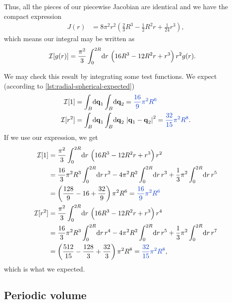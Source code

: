 Thus, all the pieces of our piecewise Jacobian are identical and we have the compact expression
\begin{align}
	J(r)
	&= 8 \pi^2 r^2 \left( \frac{2}{3} R^3 - \frac{1}{2} R^2 r + \frac{1}{24} r^3 \right),
			\label{eq:radial-spherical-jacobian}
\end{align}
which means our integral may be written as
\begin{align}
	\mathcal{I}[g(r)]
	&= \frac{\pi^2}{3} \int_0^{2 R}\! \dif r \, \left( 16 R^3 - 12 R^2 r + r^3 \right) r^2 g(r).
\end{align}

We may check this result by integrating some test functions.
We expect (according to \vref{lst:radial-spherical-expected})
\begin{subequations} \label{eq:radial-spherical-expected}
\begin{align}
	\mathcal{I}[1]
	&= \int_\ball\! \dif \vec{q}_1 \int_\ball\! \dif \vec{q}_2
	= \blue{\frac{16}{9} \pi^2 R^6} \\
	\mathcal{I}[r^2]
	&= \int_\ball\! \dif \vec{q}_1 \int_\ball\! \dif \vec{q}_2 \, \abs[0]{\vec{q}_1 - \vec{q}_2}^2
	= \blue{\frac{32}{15} \pi^2 R^8}.
\end{align}
\end{subequations}
If we use our expression, we get
\begin{subequations}
\begin{align}
	\mathcal{I}[1]
	&= \frac{\pi^2}{3} \int_0^{2 R}\! \dif r \, \left( 16 R^3 - 12 R^2 r + r^3 \right) r^2 \\
	&= \frac{16}{3} \pi^2 R^3 \int_0^{2 R}\! \dif r \, r^2
		- 4 \pi^2 R^2 \int_0^{2 R}\! \dif r \, r^3
		+ \frac{1}{3} \pi^2 \int_0^{2 R}\! \dif r \, r^5 \\
	&= \left( \frac{128}{9} - 16 + \frac{32}{9} \right) \pi^2 R^6
	= \blue{\frac{16}{9} \pi^2 R^6} \\
	\mathcal{I}[r^2]
	&= \frac{\pi^2}{3} \int_0^{2 R}\! \dif r \, \left( 16 R^3 - 12 R^2 r + r^3 \right) r^4 \\
	&= \frac{16}{3} \pi^2 R^3 \int_0^{2 R}\! \dif r \, r^4
		- 4 \pi^2 R^2 \int_0^{2 R}\! \dif r \, r^5
		+ \frac{1}{3} \pi^2 \int_0^{2 R}\! \dif r \, r^7 \\
	&= \left( \frac{512}{15} - \frac{128}{3} + \frac{32}{3} \right) \pi^2 R^8
	= \blue{\frac{32}{15} \pi^2 R^8},
\end{align}
\end{subequations}
which is what we expected.


\subsection{Periodic volume}


